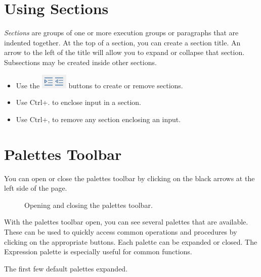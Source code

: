 \section{Using Sections}
\label{sec:using_sections}

\textit{Sections} are groups of one or more execution groups or paragraphs that are indented together. At the top of a section, you can create a section title. An arrow to the left of the title will allow you to expand or collapse that section. Subsections may be created inside other sections.

\begin{itemize}
\item Use the \includegraphics[width=0.1\textwidth]{tutorials/figures/new_section.PNG} buttons to create or remove sections.
\item Use Ctrl+. to enclose input in a section.
\item Use Ctrl+, to remove any section enclosing an input.
\end{itemize}

\section{Palettes Toolbar}
\label{sec:palettes_toolbar}

You can open or close the palettes toolbar by clicking on the black arrows at the left side of the page.
\begin{figure}
\hspace{.2cm}
\caption{Opening and closing the palettes toolbar.}
\end{figure}

With the palettes toolbar open, you can see several palettes that are available. These can be used to quickly access common operations and procedures by clicking on the appropriate buttons. Each palette can be expanded or closed. The Expression palette is especially useful for common functions.

\begin{marginfigure}
\centering
{}
\caption{The first few default palettes expanded.}
\end{marginfigure}
